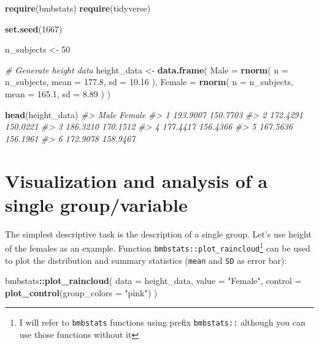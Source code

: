 \documentclass[
]{book}
\newenvironment{Shaded}{\begin{snugshade}}{\end{snugshade}}
\newcommand{\CommentTok}[1]{\textcolor[rgb]{0.56,0.35,0.01}{\textit{#1}}}
\newcommand{\DataTypeTok}[1]{\textcolor[rgb]{0.13,0.29,0.53}{#1}}
\newcommand{\DecValTok}[1]{\textcolor[rgb]{0.00,0.00,0.81}{#1}}
\newcommand{\FloatTok}[1]{\textcolor[rgb]{0.00,0.00,0.81}{#1}}
\newcommand{\KeywordTok}[1]{\textcolor[rgb]{0.13,0.29,0.53}{\textbf{#1}}}
\newcommand{\NormalTok}[1]{#1}
\newcommand{\OperatorTok}[1]{\textcolor[rgb]{0.81,0.36,0.00}{\textbf{#1}}}
\newcommand{\StringTok}[1]{\textcolor[rgb]{0.31,0.60,0.02}{#1}}
\begin{document}
\begin{Shaded}
\begin{Highlighting}[]
\KeywordTok{require}\NormalTok{(bmbstats)}
\KeywordTok{require}\NormalTok{(tidyverse)}

\KeywordTok{set.seed}\NormalTok{(}\DecValTok{1667}\NormalTok{)}

\NormalTok{n\_subjects <{-}}\StringTok{ }\DecValTok{50}

\CommentTok{\# Generate height data}
\NormalTok{height\_data <{-}}\StringTok{ }\KeywordTok{data.frame}\NormalTok{(}
  \DataTypeTok{Male =} \KeywordTok{rnorm}\NormalTok{(}
    \DataTypeTok{n =}\NormalTok{ n\_subjects,}
    \DataTypeTok{mean =} \FloatTok{177.8}\NormalTok{,}
    \DataTypeTok{sd =} \FloatTok{10.16}
\NormalTok{  ),}
  \DataTypeTok{Female =} \KeywordTok{rnorm}\NormalTok{(}
    \DataTypeTok{n =}\NormalTok{ n\_subjects,}
    \DataTypeTok{mean =} \FloatTok{165.1}\NormalTok{,}
    \DataTypeTok{sd =} \FloatTok{8.89}
\NormalTok{  )}
\NormalTok{)}

\KeywordTok{head}\NormalTok{(height\_data)}
\CommentTok{\#>       Male   Female}
\CommentTok{\#> 1 193.9007 150.7703}
\CommentTok{\#> 2 172.4291 150.0221}
\CommentTok{\#> 3 186.3210 170.1512}
\CommentTok{\#> 4 177.4417 156.4366}
\CommentTok{\#> 5 167.5636 156.1961}
\CommentTok{\#> 6 172.9078 158.9467}
\end{Highlighting}
\end{Shaded}

\hypertarget{visualization-and-analysis-of-a-single-groupvariable}{%
\section{Visualization and analysis of a single group/variable}\label{visualization-and-analysis-of-a-single-groupvariable}}

The simplest descriptive task is the description of a single group. Let's use height of the females as an example. Function \texttt{bmbstats::plot\_raincloud}\footnote{I will refer to \texttt{bmbstats} functions using prefix \texttt{bmbstats::} although you can use those functions without it} can be used to plot the distribution and summary statistics (\texttt{mean} and \texttt{SD} as error bar):

\begin{Shaded}
\begin{Highlighting}[]
\NormalTok{bmbstats}\OperatorTok{::}\KeywordTok{plot\_raincloud}\NormalTok{(}
  \DataTypeTok{data =}\NormalTok{ height\_data,}
  \DataTypeTok{value =} \StringTok{"Female"}\NormalTok{,}
  \DataTypeTok{control =} \KeywordTok{plot\_control}\NormalTok{(}\DataTypeTok{group\_colors =} \StringTok{"pink"}\NormalTok{)}
\NormalTok{)}
\end{Highlighting}
\end{Shaded}
\end{document}

